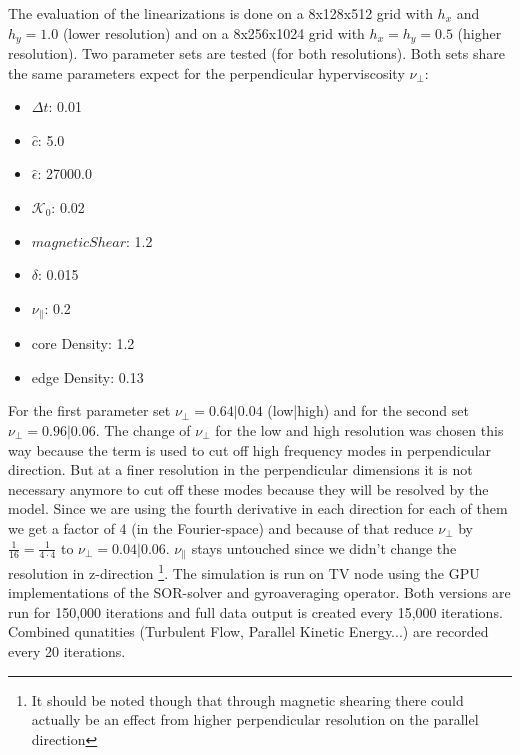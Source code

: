\documentclass[master.tex]{subfiles}
\begin{document}
The evaluation of the linearizations is done on a 8x128x512 grid with $h_x$ and $h_y=1.0$ (lower resolution) and on a 8x256x1024 grid with $h_x = h_y=0.5$ (higher resolution). Two parameter sets are tested (for both resolutions). Both sets share the same parameters expect for the perpendicular hyperviscosity $\nu_\perp$:
\begin{itemize}
    \item $\Delta t$: 0.01
    \item $\hat{c}$: 5.0
    \item $\hat{\epsilon}$: 27000.0
    \item $\mathcal{K}_0$: 0.02
    \item $magnetic Shear$: 1.2
    \item $\delta$: 0.015
    \item $\nu_{\parallel}$: 0.2
    \item core Density: 1.2
    \item edge Density: 0.13
\end{itemize}
For the first parameter set $\nu_{\perp} = 0.64|0.04$ (low|high) and for the second set $\nu_{\perp} = 0.96|0.06$. The change of $\nu_\perp$ for the low and high resolution was chosen this way because the term is used to cut off high frequency modes in perpendicular direction. But at a finer resolution in the perpendicular dimensions it is not necessary anymore to cut off these modes because they will be resolved by the model. Since we are using the fourth derivative in each direction for each of them we get a factor of 4 (in the Fourier-space) and because of that reduce $\nu_\perp$ by $\frac{1}{16} = \frac{1}{4\cdot4}$ to $\nu_\perp = 0.04|0.06$. $\nu_\parallel$ stays untouched since we didn't change the resolution in z-direction \footnote{It should be noted though that through magnetic shearing there could actually be an effect from higher perpendicular resolution on the parallel direction}.\newline
The simulation is run on \ac{TV} node using the GPU implementations of the \ac{SOR}-solver and gyroaveraging operator. Both versions are run for 150,000 iterations and full data output is created every 15,000 iterations. Combined qunatities (Turbulent Flow, Parallel Kinetic Energy...) are recorded every 20 iterations.
\end{document}
